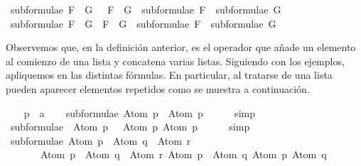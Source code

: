 \begin{isabellebody}
{\isacharbar}\ {\isachardoublequoteopen}subformulae\ {\isacharparenleft}F\ \isactrlbold {\isasymor}\ G{\isacharparenright}\ \ {\isacharequal}\ {\isacharparenleft}F\ \isactrlbold {\isasymor}\ G{\isacharparenright}\ {\isacharhash}\ subformulae\ F\ {\isacharat}\ subformulae\ G{\isachardoublequoteclose}\isanewline
{\isacharbar}\ {\isachardoublequoteopen}subformulae\ {\isacharparenleft}F\ \isactrlbold {\isasymrightarrow}\ G{\isacharparenright}\ {\isacharequal}\ {\isacharparenleft}F\ \isactrlbold {\isasymrightarrow}\ G{\isacharparenright}\ {\isacharhash}\ subformulae\ F\ {\isacharat}\ subformulae\ G{\isachardoublequoteclose}%
\begin{isamarkuptext}%
Observemos que, en la definición anterior, \isa{{\isacharhash}} es el operador que añade un elemento al 
  comienzo de una lista y \isa{{\isacharat}} concatena varias listas. Siguiendo con los ejemplos, apliquemos
   en las distintas fórmulas. En particular, al tratarse de una 
  lista pueden aparecer elementos repetidos como se muestra a continuación.%
\end{isamarkuptext}\isamarkuptrue%
\isamarkupfalse%
\isanewline
{}\isanewline
%
\isadelimproof
\ \ %
\endisadelimproof
%
\isatagproof
{}\isamarkupfalse%
\ p\ {\isacharcolon}{\isacharcolon}\ {\isacharprime}a\isanewline
\isanewline
\ \ \isamarkupfalse%
\ {\isachardoublequoteopen}subformulae\ {\isacharparenleft}Atom\ p{\isacharparenright}\ {\isacharequal}\ {\isacharbrackleft}Atom\ p{\isacharbrackright}{\isachardoublequoteclose}\isanewline
\ \ \ \ \isamarkupfalse%
\ simp\isanewline
\isanewline
\ \ \isamarkupfalse%
\ {\isachardoublequoteopen}subformulae\ {\isacharparenleft}\isactrlbold {\isasymnot}\ {\isacharparenleft}Atom\ p{\isacharparenright}{\isacharparenright}\ {\isacharequal}\ {\isacharbrackleft}\isactrlbold {\isasymnot}\ {\isacharparenleft}Atom\ p{\isacharparenright}{\isacharcomma}\ Atom\ p{\isacharbrackright}{\isachardoublequoteclose}\isanewline
\ \ \ \ \isamarkupfalse%
\ simp\isanewline
\isanewline
\ \ \isamarkupfalse%
\ {\isachardoublequoteopen}subformulae\ {\isacharparenleft}{\isacharparenleft}Atom\ p\ \isactrlbold {\isasymrightarrow}\ Atom\ q{\isacharparenright}\ \isactrlbold {\isasymor}\ Atom\ r{\isacharparenright}\ {\isacharequal}\ \isanewline
\ \ \ \ \ \ \ {\isacharbrackleft}{\isacharparenleft}Atom\ p\ \isactrlbold {\isasymrightarrow}\ Atom\ q{\isacharparenright}\ \isactrlbold {\isasymor}\ Atom\ r{\isacharcomma}\ Atom\ p\ \isactrlbold {\isasymrightarrow}\ Atom\ q{\isacharcomma}\ Atom\ p{\isacharcomma}\ Atom\ q{\isacharcomma}\ \isanewline

\end{isabellebody}
